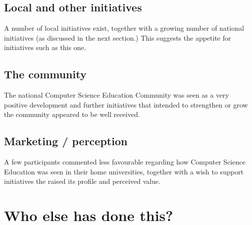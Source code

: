 \documentclass[sigconf]{acmart}
\begin{document}
\subsection{Local and other initiatives}
A number of local initiatives exist, together with a growing number of national initiatives (as discussed in the next section.) This suggests the appetite for initiatives such as this one.
\subsection{The community}
The national Computer Science Education Community was seen as a very positive development and further initiatives that intended to strengthen or grow the community appeared to be well received.
\subsection{Marketing / perception}
A few participants commented less favourable regarding how Computer Science Education was seen in their home universities, together with a wish to support initiatives the raised its profile and perceived value. 

\section{Who else has done this?}
\end{document}
